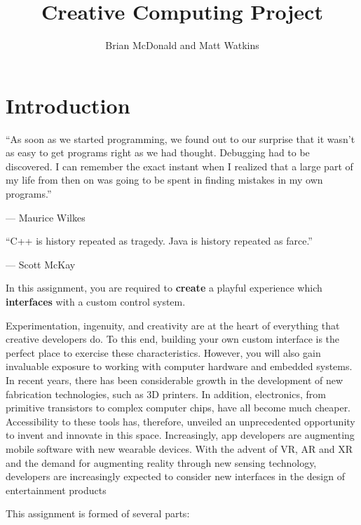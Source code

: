 \documentclass{../../fal_assignment}
\title{Creative Computing Project}
\author{Brian McDonald and Matt Watkins}
\begin{document}
	
	\maketitle
	
	\section*{Introduction}
	
	\begin{marginquote}
		``As soon as we started programming, we found out to our surprise that it 
		wasn't as easy to get programs right as we had thought. 
		Debugging had to be discovered. I can remember the exact instant when 
		I realized that a large part of my life from then on was going to be spent 
		in finding mistakes in my own programs.''
		\par --- Maurice Wilkes
		\marginquoterule
		\par ``C++ is history repeated as tragedy. Java is history repeated as farce.''
		\par --- Scott McKay
	\end{marginquote}
	
	In this assignment, you are required to \textbf{create} a playful experience 
	which \textbf{interfaces} with a custom control system.
	
	Experimentation, ingenuity, and creativity are at the heart of everything that 
	creative developers do. To this end, building your own custom interface is the perfect 
	place to exercise these characteristics. However, you will also gain invaluable exposure to 
	working with computer hardware and embedded systems. In recent years, there has been considerable growth in the 
	development of new fabrication technologies, such as 3D printers. In addition, electronics, 
	from primitive transistors to complex computer chips, have all become much cheaper. Accessibility 
	to these tools has, therefore, unveiled an unprecedented opportunity to invent and innovate 
	in this space. Increasingly, app developers are augmenting mobile software with new wearable 
	devices. With the advent of VR, AR and XR and the demand for augmenting reality through new sensing technology, developers are increasingly expected to consider new interfaces in the design of entertainment products
	
	This assignment is formed of several parts:
	
\end{document}
